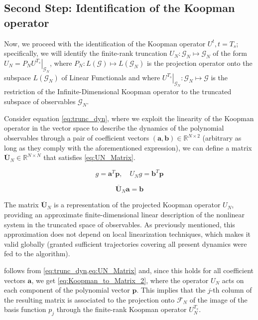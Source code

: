 \documentclass{article}
\begin{document}
    \subsection{Second Step: Identification of the Koopman operator}

        Now, we proceed with the identification of the Koopman operator $U^t , t = T_s$; specifically, we will identify the finite-rank truncation $U_N: \mathcal{G}_N \mapsto \mathcal{G}_N$ of the form $U_N = P_N \left.U^{T_s}\right|_{\mathcal{G}_N}$, where $P_N : L\left(\mathcal{G}\right) \mapsto L\left(\mathcal{G}_N\right)$ is the projection operator onto the subspace $L\left(\mathcal{G}_N\right)$ of Linear Functionals and where $\left.U^{T_s}\right|_{\mathcal{G}_N} : \mathcal{G}_N \mapsto \mathcal{G}$ is the restriction of the Infinite-Dimensional Koopman operator to the truncated subspace of observables $\mathcal{G}_N$.
        
        Consider equation \cref{eq:trunc_dyn}, where we exploit the linearity of the Koopman operator in the vector space to describe the dynamics of the polynomial observables through a pair of coefficient vectors $\left(\mathbf{a},\mathbf{b}\right) \in \mathbb{R}^{N \times 2}$ (arbitrary as long as they comply with the aforementioned expression), we can define a matrix $\overline{\mathbf{U}}_N \in \mathbb{R}^{N \times N}$ that satisfies \cref{eq:UN_Matrix}.

        \begin{equation} \label{eq:trunc_dyn}
            g = \mathbf{a}^T \mathbf{p} , \quad U_N g = \mathbf{b}^T \mathbf{p}
        \end{equation}

        \begin{equation} \label{eq:UN_Matrix}
            \overline{\mathbf{U}}_N \mathbf{a} = \mathbf{b}
        \end{equation}

        The matrix $\overline{\mathbf{U}}_N$ is a representation of the projected Koopman operator $U_N$, providing an approximate finite-dimensional linear description of the nonlinear system in the truncated space of observables. As previously mentioned, this approximation does not depend on local linearization techniques, which makes it valid globally (granted sufficient trajectories covering all present dynamics were fed to the algorithm).

         follows from \cref{eq:trunc_dyn,eq:UN_Matrix} and, since this holds for all coefficient vectors $\mathbf{a}$, we get \cref{eq:Koopman_to_Matrix_2}, where the operator $U_N$ acts on each component of the polynomial vector $\mathbf{p}$. This implies that the $j$-th column of the resulting matrix is associated to the projection onto $\mathcal{F}_N$ of the image of the basis function $p_j$ through the finite-rank Koopman operator $U_N^{T_s}$.
\end{document}
